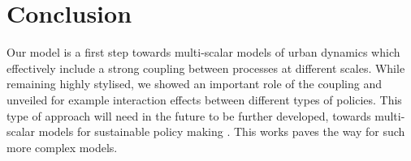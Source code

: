 \documentclass[referee,lineno,pdflatex,sn-apa]{sn-jnl}
\begin{document}


\section{Conclusion}

Our model is a first step towards multi-scalar models of urban dynamics which effectively include a strong coupling between processes at different scales. While remaining highly stylised, we showed an important role of the coupling and unveiled for example interaction effects between different types of policies. This type of approach will need in the future to be further developed, towards multi-scalar models for sustainable policy making \citep{Rozenblat2018}. This works paves the way for such more complex models.













\end{document}
